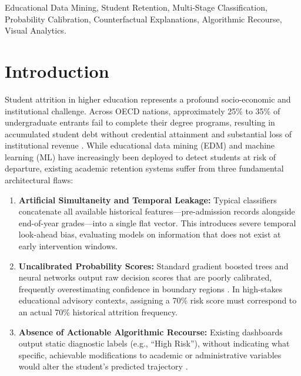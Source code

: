 \documentclass[conference]{IEEEtran}
\begin{document}
\begin{IEEEkeywords}
Educational Data Mining, Student Retention, Multi-Stage Classification, Probability Calibration, Counterfactual Explanations, Algorithmic Recourse, Visual Analytics.
\end{IEEEkeywords}

\section{Introduction}

Student attrition in higher education represents a profound socio-economic and institutional challenge. Across OECD nations, approximately 25\% to 35\% of undergraduate entrants fail to complete their degree programs, resulting in accumulated student debt without credential attainment and substantial loss of institutional revenue \cite{romero2010educational, baker2009state}. While educational data mining (EDM) and machine learning (ML) have increasingly been deployed to detect students at risk of departure, existing academic retention systems suffer from three fundamental architectural flaws:

\begin{enumerate}
    \item \textbf{Artificial Simultaneity and Temporal Leakage:} Typical classifiers concatenate all available historical features---pre-admission records alongside end-of-year grades---into a single flat vector. This introduces severe temporal look-ahead bias, evaluating models on information that does not exist at early intervention windows.
    \item \textbf{Uncalibrated Probability Scores:} Standard gradient boosted trees and neural networks output raw decision scores that are poorly calibrated, frequently overestimating confidence in boundary regions \cite{guo2017calibration}. In high-stakes educational advisory contexts, assigning a 70\% risk score must correspond to an actual 70\% historical attrition frequency.
    \item \textbf{Absence of Actionable Algorithmic Recourse:} Existing dashboards output static diagnostic labels (e.g., ``High Risk''), without indicating what specific, achievable modifications to academic or administrative variables would alter the student's predicted trajectory \cite{wachter2017counterfactual, mothilal2020explaining}.
\end{enumerate}
\end{document}
